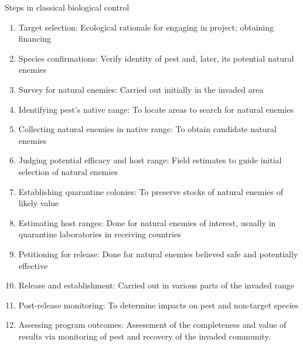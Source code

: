 \documentclass[10pt,dvipsnames,ignorenonframetext,aspectratio=169]{beamer}
\providecommand{\tightlist}{%
  \setlength{\itemsep}{0pt}\setlength{\parskip}{0pt}}
\begin{document}
\begin{frame}{Steps in classical biological control
\citep{van2016integrating}}
\protect\hypertarget{steps-in-classical-biological-control-van2016integrating}{}
\begin{enumerate}
\tightlist
\item
  Target selection: Ecological rationale for engaging in project;
  obtaining financing
\item
  Species confirmations: Verify identity of pest and, later, its
  potential natural enemies
\item
  Survey for natural enemies: Carried out initially in the invaded area
\item
  Identifying pest's native range: To locate areas to search for natural
  enemies
\item
  Collecting natural enemies in native range: To obtain candidate
  natural enemies
\item
  Judging potential efficacy and host range: Field estimates to guide
  initial selection of natural enemies
\item
  Establishing quarantine colonies: To preserve stocks of natural
  enemies of likely value
\item
  Estimating host ranges: Done for natural enemies of interest, usually
  in quarantine laboratories in receiving countries
\item
  Petitioning for release: Done for natural enemies believed safe and
  potentially effective
\item
  Release and establishment: Carried out in various parts of the invaded
  range
\item
  Post-release monitoring: To determine impacts on pest and non-target
  species
\item
  Assessing program outcomes: Assessment of the completeness and value
  of results via monitoring of pest and recovery of the invaded
  community.
\end{enumerate}
\end{frame}
\end{document}
